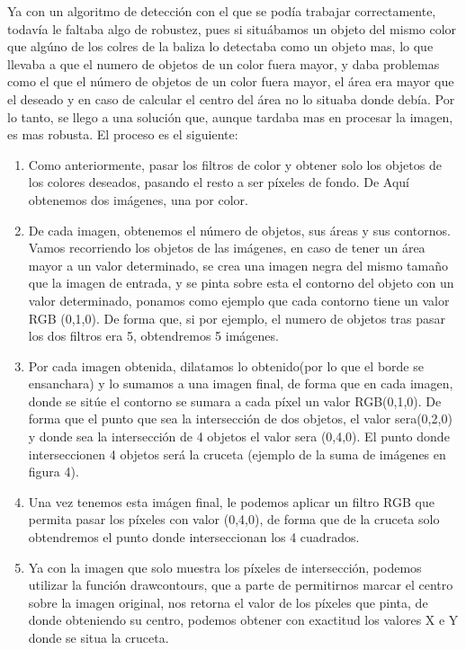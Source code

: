 \hspace{1cm} Ya con un algoritmo de detecci\'on con el que se pod\'ia trabajar correctamente, todav\'ia le faltaba algo de robustez, pues si situ\'abamos un objeto del mismo color que alg\'uno de los colres de la baliza lo detectaba como un objeto mas, lo que llevaba a que el numero de objetos de un color fuera mayor, y daba problemas como el que el n\'umero de objetos de un color fuera mayor, el \'area era mayor que el deseado y en caso de calcular el centro del \'area no lo situaba donde deb\'ia. Por lo tanto, se llego a una soluci\'on que, aunque tardaba mas en procesar la imagen, es mas robusta. El proceso es el siguiente:
\begin{enumerate}
	\item Como anteriormente, pasar los filtros de color y obtener solo los objetos de los colores deseados, pasando el resto a ser p\'ixeles de fondo. De Aqu\'i obtenemos dos im\'agenes, una por color.
	\item De cada imagen, obtenemos el n\'umero de objetos, sus \'areas y sus contornos. Vamos recorriendo los objetos de las im\'agenes,  en caso de tener un \'area mayor a un valor determinado, se crea una imagen negra del mismo tamaño que la imagen de entrada, y se pinta sobre esta el contorno del objeto con un valor determinado, ponamos como ejemplo que cada contorno tiene un valor RGB (0,1,0). De forma que, si por ejemplo, el numero de objetos tras pasar los dos filtros era 5, obtendremos 5 im\'agenes. 
	\item Por cada imagen obtenida, dilatamos lo obtenido(por lo que el borde se ensanchara) y lo sumamos a una imagen final, de forma que en cada imagen, donde se sit\'ue el contorno se sumara a cada p\'ixel un valor RGB(0,1,0). De forma que el punto que sea la intersecci\'on de dos objetos, el valor sera(0,2,0) y donde sea la intersecci\'on de 4 objetos el valor sera (0,4,0). El punto donde interseccionen 4 objetos ser\'a la cruceta (ejemplo de la suma de im\'agenes en figura 4).
	\item Una vez tenemos esta im\'agen final, le podemos aplicar un filtro RGB que permita pasar los p\'ixeles con valor (0,4,0), de forma que de la cruceta solo obtendremos el punto donde interseccionan los 4 cuadrados.
	\item Ya con la imagen que solo muestra los p\'ixeles de intersecci\'on, podemos utilizar la funci\'on drawcontours, que a parte de permitirnos marcar el centro sobre la imagen original, nos retorna el valor de los p\'ixeles que pinta, de donde obteniendo su centro, podemos obtener con exactitud los valores X e Y donde se situa la cruceta.

\end{enumerate}
